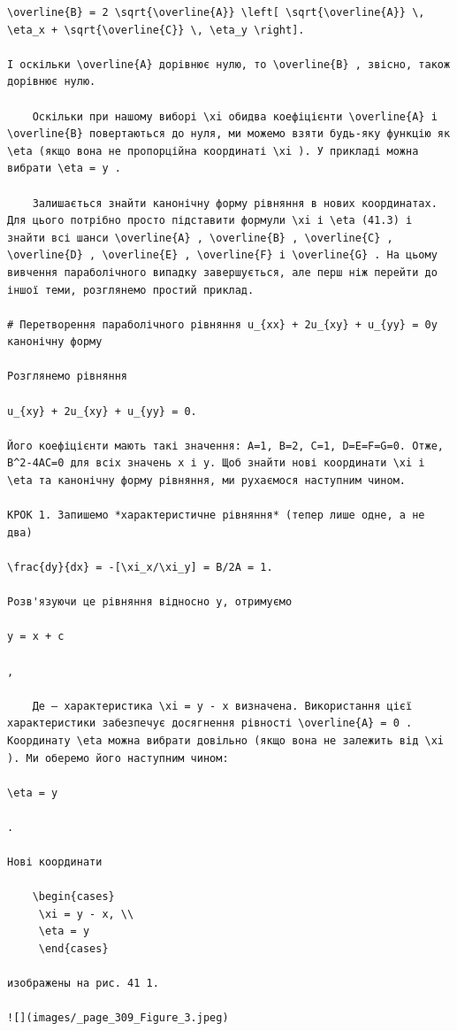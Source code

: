 \documentclass[
  ukrainian,
]{article}
\begin{document}
\begin{verbatim}
\overline{B} = 2 \sqrt{\overline{A}} \left[ \sqrt{\overline{A}} \, \eta_x + \sqrt{\overline{C}} \, \eta_y \right].

І оскільки \overline{A} дорівнює нулю, то \overline{B} , звісно, також дорівнює нулю.

    Оскільки при нашому виборі \xi обидва коефіцієнти \overline{A} і \overline{B} повертаються до нуля, ми можемо взяти будь-яку функцію як \eta (якщо вона не пропорційна координаті \xi ). У прикладі можна вибрати \eta = y .

    Залишається знайти канонічну форму рівняння в нових координатах. Для цього потрібно просто підставити формули \xi і \eta (41.3) і знайти всі шанси \overline{A} , \overline{B} , \overline{C} , \overline{D} , \overline{E} , \overline{F} і \overline{G} . На цьому вивчення параболічного випадку завершується, але перш ніж перейти до іншої теми, розглянемо простий приклад.

# Перетворення параболічного рівняння u_{xx} + 2u_{xy} + u_{yy} = 0у канонічну форму

Розглянемо рівняння

u_{xy} + 2u_{xy} + u_{yy} = 0.

Його коефіцієнти мають такі значення: A=1, B=2, C=1, D=E=F=G=0. Отже, B^2-4AC=0 для всіх значень x і y. Щоб знайти нові координати \xi і \eta та канонічну форму рівняння, ми рухаємося наступним чином.

КРОК 1. Запишемо *характеристичне рівняння* (тепер лише одне, а не два)

\frac{dy}{dx} = -[\xi_x/\xi_y] = B/2A = 1.

Розв'язуючи це рівняння відносно y, отримуємо

y = x + c

,

    Де — характеристика \xi = y - x визначена. Використання цієї характеристики забезпечує досягнення рівності \overline{A} = 0 . Координату \eta можна вибрати довільно (якщо вона не залежить від \xi ). Ми оберемо його наступним чином:

\eta = y

.

Нові координати

    \begin{cases}
     \xi = y - x, \\
     \eta = y
     \end{cases}

изображены на рис. 41 1.

![](images/_page_309_Figure_3.jpeg)


\end{verbatim}
\end{document}
